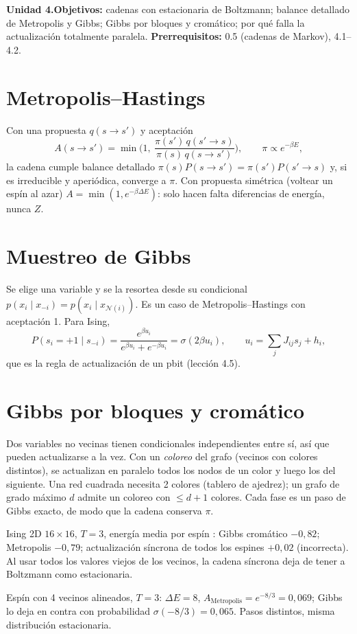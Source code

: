 \documentclass[11pt,a4paper]{article}
\begin{document}

\noindent\textbf{Unidad 4.}\quad\textbf{Objetivos:} cadenas con estacionaria de Boltzmann; balance detallado de Metropolis y Gibbs;
Gibbs por bloques y cromático; por qué falla la actualización totalmente paralela.
\textbf{Prerrequisitos:} 0.5 (cadenas de Markov), 4.1--4.2.

\section{Metropolis--Hastings}
Con una propuesta $q(s\to s')$ y aceptación
\begin{equation}
A(s\to s')=\min\Big(1,\ \frac{\pi(s')\,q(s'\to s)}{\pi(s)\,q(s\to s')}\Big),\qquad \pi\propto e^{-\beta E},
\end{equation}
la cadena cumple balance detallado $\pi(s)P(s\to s')=\pi(s')P(s'\to s)$ y, si es irreducible y aperiódica, converge a $\pi$. Con propuesta simétrica
(voltear un espín al azar) $A=\min(1,e^{-\beta\Delta E})$: solo hacen falta diferencias de energía, nunca $Z$.

\section{Muestreo de Gibbs}
Se elige una variable y se la resortea desde su condicional $p(x_i\mid x_{-i})=p(x_i\mid x_{\mathcal N(i)})$. Es un caso de Metropolis--Hastings con
aceptación 1. Para Ising,
\begin{equation}
P(s_i=+1\mid s_{-i})=\frac{e^{\beta u_i}}{e^{\beta u_i}+e^{-\beta u_i}}=\sigma(2\beta u_i),\qquad u_i=\sum_jJ_{ij}s_j+h_i,
\end{equation}
que es la regla de actualización de un pbit (lección 4.5).

\section{Gibbs por bloques y cromático}
Dos variables no vecinas tienen condicionales independientes entre sí, así que pueden actualizarse a la vez. Con un \emph{coloreo} del grafo
(vecinos con colores distintos), se actualizan en paralelo todos los nodos de un color y luego los del siguiente. Una red cuadrada necesita 2
colores (tablero de ajedrez); un grafo de grado máximo $d$ admite un coloreo con $\le d+1$ colores. Cada fase es un paso de Gibbs exacto, de modo
que la cadena conserva $\pi$.
\begin{ejemplo}
Ising 2D $16\times16$, $T=3$, energía media por espín \evS: Gibbs cromático $-0{,}82$; Metropolis $-0{,}79$; actualización síncrona de todos los
espines $+0{,}02$ (incorrecta). Al usar todos los valores viejos de los vecinos, la cadena síncrona deja de tener a Boltzmann como estacionaria.
\end{ejemplo}
\begin{ejemplo}
Espín con 4 vecinos alineados, $T=3$: $\Delta E=8$, $A_{\text{Metropolis}}=e^{-8/3}=0{,}069$; Gibbs lo deja en contra con probabilidad
$\sigma(-8/3)=0{,}065$. Pasos distintos, misma distribución estacionaria.
\end{ejemplo}
\end{document}
